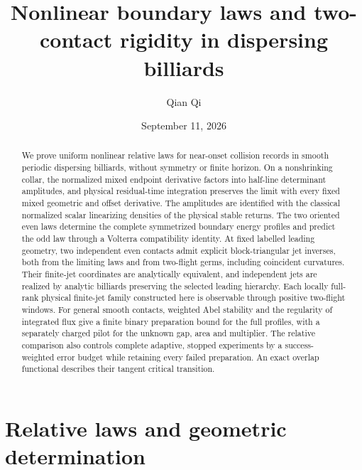 
\title[Nonlinear boundary laws and two-contact rigidity]{Nonlinear boundary laws and two-contact rigidity
in dispersing billiards}
\author{Qian Qi}
\date{September 11, 2026}

\begin{abstract}
We prove uniform nonlinear relative laws for near-onset collision
records in smooth periodic dispersing billiards, without symmetry or
finite horizon. On a nonshrinking collar, the normalized mixed endpoint
derivative factors into half-line determinant amplitudes, and physical
residual-time integration preserves the limit with every fixed mixed
geometric and offset derivative. The amplitudes are identified with the
classical normalized scalar linearizing densities of the physical stable
returns. The two oriented even laws determine the complete symmetrized
boundary energy profiles and predict the odd law through a Volterra
compatibility identity. At fixed labelled leading geometry, two independent
even contacts admit explicit block-triangular jet inverses, both from the
limiting laws and from two-flight germs, including coincident curvatures.
Their finite-jet coordinates are analytically equivalent, and independent
jets are realized by analytic billiards preserving the selected leading
hierarchy. Each locally full-rank physical finite-jet family constructed
here is observable through positive two-flight windows. For general smooth
contacts, weighted Abel stability and the regularity of integrated flux
give a finite binary preparation bound for the full profiles, with a
separately charged pilot for the unknown gap, area and multiplier.
The relative comparison also controls complete adaptive, stopped
experiments by a success-weighted error budget while retaining every
failed preparation. An exact overlap functional describes their tangent
critical transition.
\end{abstract}
\maketitle


\part{Relative laws and geometric determination}














